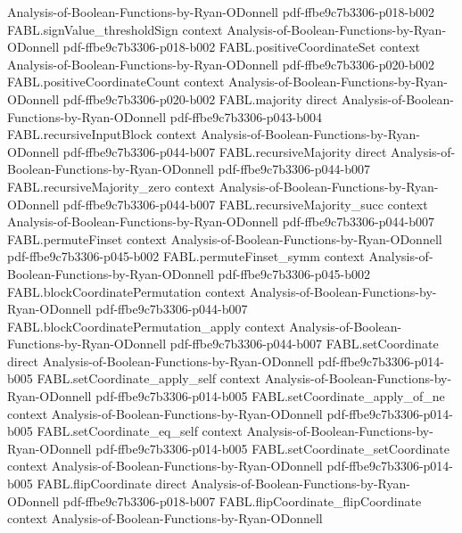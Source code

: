 \begin{theorem}
  {Analysis-of-Boolean-Functions-by-Ryan-ODonnell}
  {pdf-ffbe9c7b3306-p018-b002}
\proofstep
  {FABL.signValue_thresholdSign}
  {context}
  {Analysis-of-Boolean-Functions-by-Ryan-ODonnell}
  {pdf-ffbe9c7b3306-p018-b002}
\proofstep
  {FABL.positiveCoordinateSet}
  {context}
  {Analysis-of-Boolean-Functions-by-Ryan-ODonnell}
  {pdf-ffbe9c7b3306-p020-b002}
\proofstep
  {FABL.positiveCoordinateCount}
  {context}
  {Analysis-of-Boolean-Functions-by-Ryan-ODonnell}
  {pdf-ffbe9c7b3306-p020-b002}
\proofstep
  {FABL.majority}
  {direct}
  {Analysis-of-Boolean-Functions-by-Ryan-ODonnell}
  {pdf-ffbe9c7b3306-p043-b004}
\proofstep
  {FABL.recursiveInputBlock}
  {context}
  {Analysis-of-Boolean-Functions-by-Ryan-ODonnell}
  {pdf-ffbe9c7b3306-p044-b007}
\proofstep
  {FABL.recursiveMajority}
  {direct}
  {Analysis-of-Boolean-Functions-by-Ryan-ODonnell}
  {pdf-ffbe9c7b3306-p044-b007}
\proofstep
  {FABL.recursiveMajority_zero}
  {context}
  {Analysis-of-Boolean-Functions-by-Ryan-ODonnell}
  {pdf-ffbe9c7b3306-p044-b007}
\proofstep
  {FABL.recursiveMajority_succ}
  {context}
  {Analysis-of-Boolean-Functions-by-Ryan-ODonnell}
  {pdf-ffbe9c7b3306-p044-b007}
\proofstep
  {FABL.permuteFinset}
  {context}
  {Analysis-of-Boolean-Functions-by-Ryan-ODonnell}
  {pdf-ffbe9c7b3306-p045-b002}
\proofstep
  {FABL.permuteFinset_symm}
  {context}
  {Analysis-of-Boolean-Functions-by-Ryan-ODonnell}
  {pdf-ffbe9c7b3306-p045-b002}
\proofstep
  {FABL.blockCoordinatePermutation}
  {context}
  {Analysis-of-Boolean-Functions-by-Ryan-ODonnell}
  {pdf-ffbe9c7b3306-p044-b007}
\proofstep
  {FABL.blockCoordinatePermutation_apply}
  {context}
  {Analysis-of-Boolean-Functions-by-Ryan-ODonnell}
  {pdf-ffbe9c7b3306-p044-b007}
\proofstep
  {FABL.setCoordinate}
  {direct}
  {Analysis-of-Boolean-Functions-by-Ryan-ODonnell}
  {pdf-ffbe9c7b3306-p014-b005}
\proofstep
  {FABL.setCoordinate_apply_self}
  {context}
  {Analysis-of-Boolean-Functions-by-Ryan-ODonnell}
  {pdf-ffbe9c7b3306-p014-b005}
\proofstep
  {FABL.setCoordinate_apply_of_ne}
  {context}
  {Analysis-of-Boolean-Functions-by-Ryan-ODonnell}
  {pdf-ffbe9c7b3306-p014-b005}
\proofstep
  {FABL.setCoordinate_eq_self}
  {context}
  {Analysis-of-Boolean-Functions-by-Ryan-ODonnell}
  {pdf-ffbe9c7b3306-p014-b005}
\proofstep
  {FABL.setCoordinate_setCoordinate}
  {context}
  {Analysis-of-Boolean-Functions-by-Ryan-ODonnell}
  {pdf-ffbe9c7b3306-p014-b005}
\proofstep
  {FABL.flipCoordinate}
  {direct}
  {Analysis-of-Boolean-Functions-by-Ryan-ODonnell}
  {pdf-ffbe9c7b3306-p018-b007}
\proofstep
  {FABL.flipCoordinate_flipCoordinate}
  {context}
  {Analysis-of-Boolean-Functions-by-Ryan-ODonnell}

\end{theorem}
